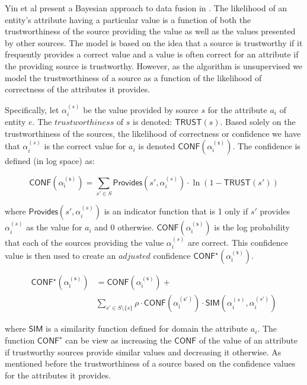 \documentclass{acm_proc_article-sp}
\begin{document}
Yin et al present a Bayesian approach to data fusion in \cite{yin:truth}.  The likelihood of an entity's attribute having a particular value is a function of both the trustworthiness of the source providing the value as well as the values presented by other sources. The model is based on the idea that a source is trustworthy if it frequently provides a correct value and a value is often correct for an attribute if the providing source is trustworthy. However, as the algorithm is unsupervised we model the trustworthiness of a source as a function of the likelihood of correctness of the attributes it provides. 

Specifically, let $\alpha_i^{(s)}$ be the value provided by source $s$ for the attribute $a_i$ of entity $e$. The $trustworthiness$ of $s$ is denoted: $\mathsf{TRUST}(s)$. Based solely on the trustworthiness of the sources, the likelihood of correctness or confidence we have that $\alpha_i^{(s)}$ is the correct value for $a_i$ is denoted $\mathsf{CONF(\alpha_i^{(s)})}$.  The confidence is defined (in log space) as:

\begin{equation}
\mathsf{CONF(\alpha_i^{(s)})} = \sum_{s' \in S} \mathsf{Provides}(s',\alpha_i^{(s)}) \cdot \ln(1-\mathsf{TRUST}(s'))
\end{equation}

where $\mathsf{Provides}(s',\alpha_i^{(s)})$ is an indicator function that is 1 only if $s'$ provides $\alpha_i^{(s)}$ as the value for $a_i$ and 0 otherwise. $\mathsf{CONF(\alpha_i^{(s)})}$ is the log probability that each of the sources providing the value $\alpha_i^{(s)}$ are correct. This confidence value is then used to create an $adjusted$ confidence $\mathsf{CONF^\star(\alpha_i^{(s)})}$.

\begin{align}
\mathsf{CONF^\star(\alpha_i^{(s)})} &= \mathsf{CONF(\alpha_i^{(s)})} + \\ \nonumber
&  \sum_{s' \in S \setminus \{s\}} \rho \cdot \mathsf{CONF(\alpha_i^{(s')})}  \cdot \mathsf{SIM}(\alpha_i^{(s)},\alpha_i^{(s')})
\end{align}

where $\mathsf{SIM}$ is a similarity function defined  for domain the attribute $a_i$. The function $\mathsf{CONF}^\star$ can be view as increasing  the $\mathsf{CONF}$ of the value of an attribute if trustworthy sources provide similar values and decreasing it otherwise. As mentioned before the trustworthiness of a source based on the confidence values for the attributes it provides. 
\end{document}
